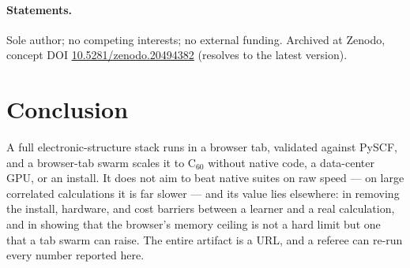 \documentclass[11pt]{article}
\newcommand{\Csixty}{\ensuremath{\mathrm{C}_{60}}}
\begin{document}
\paragraph{Statements.} Sole author; no competing interests; no external
funding. Archived at Zenodo, concept DOI
\href{https://doi.org/10.5281/zenodo.20494382}{10.5281/zenodo.20494382}
(resolves to the latest version).

\section{Conclusion}

A full electronic-structure stack runs in a browser tab, validated against
PySCF, and a browser-tab swarm scales it to \Csixty{} without native code, a
data-center GPU, or an install. It does not aim to beat native suites on raw
speed --- on large correlated calculations it is far slower --- and its value
lies elsewhere: in removing the install, hardware, and cost barriers between a
learner and a real calculation, and in showing that the browser's memory
ceiling is not a hard limit but one that a tab swarm can raise. The entire
artifact is a URL, and a referee can re-run every number reported here.



\end{document}
